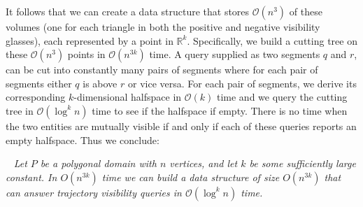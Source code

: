 \documentclass[UKenglish]{lipics-v2019}
\newcommand{\thmheadfont}{\textcolor{darkgray}{$\blacktriangleright$}\nobreakspace\sffamily\bfseries}
\newenvironment{repeatenv}[2]%
  {\smallskip\noindent {\thmheadfont #1~\ref{#2}.}\ \slshape}
  {\normalfont}
\newenvironment{repeattheorem}    [1]{\begin{repeatenv}{Theorem}{#1}}    {\end{repeatenv}}
\begin{document}
It follows that we can create a data structure that stores $\mathcal{O}(n^3)$ of these volumes (one for each triangle in both the positive and negative visibility glasses), each represented by a point in $\mathbb{R}^k$. Specifically, we build a cutting tree on these $\mathcal{O}(n^3)$ points in $\mathcal{O}(n^{3k})$ time. A query supplied as two segments $q$ and $r$, can be cut into constantly many pairs of segments where for each pair of segments either $q$ is above $r$ or vice versa. For each pair of segments, we derive its corresponding $k$-dimensional halfspace in $\mathcal{O}(k)$ time and we query the cutting tree in $\mathcal{O}(\log^k n)$ time to see if the halfspace if empty. There is no time when the two entities are mutually visible if and only if each of these queries reports an empty halfspace. Thus we conclude:

\begin{repeattheorem}{thm:polygonal_moving}
  Let $P$ be a polygonal domain with $n$ vertices, and let $k$ be some sufficiently large constant. In $O(n^{3k})$ time we
  can build a data structure of size $O(n^{3k})$ that can answer
  trajectory visibility queries in $\mathcal{O}(\log^k n)$ time.
\end{repeattheorem}
\end{document}
